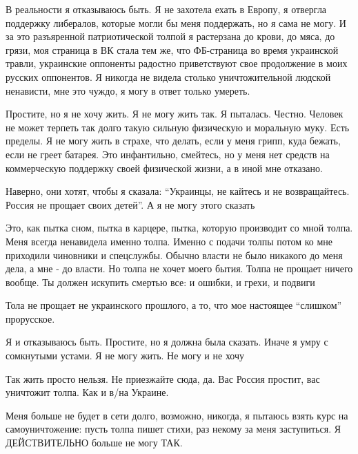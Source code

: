 В реальности я отказываюсь быть. Я не захотела ехать в Европу, я отвергла
поддержку либералов, которые могли бы меня поддержать, но я сама не могу. И за
это разъяренной патриотической толпой я растерзана до крови, до мяса, до грязи,
моя страница в ВК стала тем же, что ФБ-страница во время украинской травли,
украинские оппоненты радостно приветствуют свое продолжение в моих русских
оппонентов. Я никогда не видела столько уничтожительной людской ненависти, мне
это чуждо, я могу в ответ только умереть.

Простите, но я не хочу жить. Я не могу жить так. Я пыталась. Честно. Человек не
может терпеть так долго такую сильную физическую и моральную муку. Есть
пределы. Я не могу жить в страхе, что делать, если у меня грипп, куда бежать,
если не греет батарея. Это инфантильно, смейтесь, но у меня нет средств на
коммерческую поддержку своей физической жизни, а в иной мне отказано.

Наверно, они хотят, чтобы я сказала: \enquote{Украинцы, не кайтесь и не возвращайтесь.
Россия не прощает своих детей}. А я не могу этого сказать

Это, как пытка сном, пытка в карцере, пытка, которую производит со мной толпа.
Меня всегда ненавидела именно толпа. Именно с подачи толпы потом ко мне
приходили чиновники и спецслужбы. Обычно власти не было никакого до меня дела,
а мне - до власти. Но толпа не хочет моего бытия. Толпа не прощает ничего
вообще. Ты должен искупить смертью все: и ошибки, и грехи, и подвиги

Тола не прощает не украинского прошлого, а то, что мое настоящее \enquote{слишком}
прорусское. 

Я и отказываюсь быть. Простите, но я должна была сказать. Иначе я умру с
сомкнутыми устами. Я не могу жить. Не могу и не хочу

Так жить просто нельзя. Не приезжайте сюда, да. Вас  Россия простит, вас
уничтожит толпа. Как и в/на Украине.

Меня больше не будет в сети долго, возможно, никогда, я пытаюсь взять курс на
самоуничтожение: пусть толпа пишет стихи, раз некому за меня заступиться. Я
ДЕЙСТВИТЕЛЬНО больше не могу ТАК.



